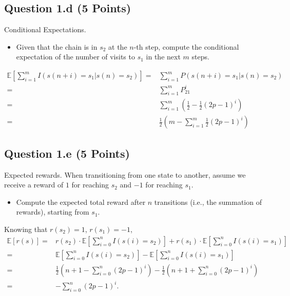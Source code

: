 \documentclass[12pt]{article}
\begin{document}
\subsection*{Question 1.d (5 Points)} Conditional Expectations.
    \begin{itemize}
        \item Given that the chain is in $s_2$ at the $n$-th step, compute the conditional expectation of the number of visits to $s_1$ in the next $m$ steps.
    \end{itemize}
\begin{solution}
\begin{align}
    \mathbb{E}[\sum_{i = 1}^{m}I(s(n+i)=s_1 | s(n)=s_2)] 
    = & \sum_{i = 1}^{m}P(s(n+i) = s_1 | s(n)=s_2)\\
    = & \sum_{i = 1}^{m}P^i_{21} \\
    = & \sum_{i = 1}^{m}(\frac{1}{2} - \frac{1}{2}(2p - 1)^i) \\
    = & \frac{1}{2}\left(m - \sum_{i = 1}^{m}\frac{1}{2}(2p - 1)^i \right)
\end{align}
\end{solution}

\subsection*{Question 1.e (5 Points)} Expected rewards. When transitioning from one state to another, assume we receive a reward of $1$ for reaching $s_2$ and $-1$ for reaching $s_1$.
\begin{itemize}
    \item Compute the expected total reward after 
$n$ transitions (i.e., the summation of rewards), starting from $s_1$.
\end{itemize}

\begin{solution}
Knowing that $r(s_2) = 1$, $r(s_1) = -1$,
\begin{align}
    \mathbb{E}[r(s)] 
    = & r(s_2)\cdot\mathbb{E}[\sum_{i=0}^{n}I(s(i)=s_2)] + r(s_1)\cdot \mathbb{E}[\sum_{i=0}^{n}I(s(i)=s_1)]\\
    = & \mathbb{E}[\sum_{i=0}^{n}I(s(i)=s_2)] - \mathbb{E}[\sum_{i=0}^{n}I(s(i)=s_1)]\\
    = & \frac{1}{2}\left(n + 1 - \sum_{i=0}^{n}(2p - 1)^{i}\right) - \frac{1}{2}\left(n + 1 + \sum_{i=0}^{n}(2p - 1)^{i}\right) \\
    = & - \sum_{i=0}^{n}(2p - 1)^{i}.
\end{align}
\end{solution}
\end{document}
